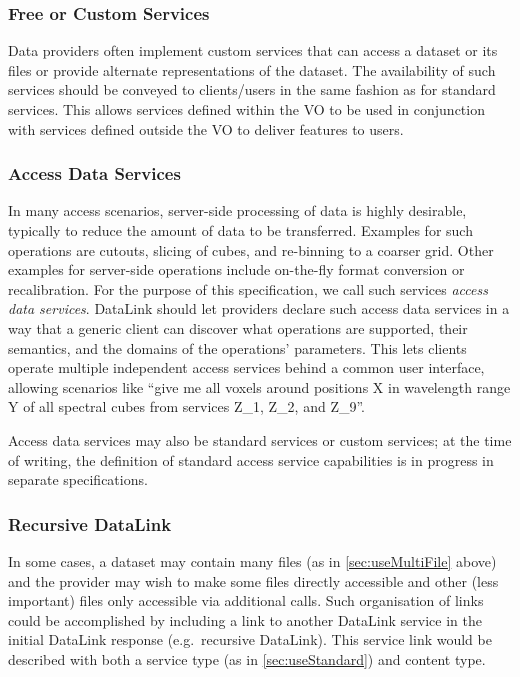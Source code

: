 \documentclass[11pt,a4paper]{ivoa}
\begin{document}
\subsubsection{Free or Custom Services}
\label{sec:useCustom}

Data providers often implement custom services that can access a dataset
or its files or provide alternate representations of the dataset. The
availability of such services should be conveyed to clients/users in
the same fashion as for standard services. This allows services defined
within the VO to be used in conjunction with services defined outside
the VO to deliver features to users.


\subsubsection{Access Data Services}

In many access scenarios, server-side processing of data is
highly desirable, typically to reduce the amount of data to be
transferred. Examples for such operations are cutouts, slicing of
cubes, and re-binning to a coarser grid. Other examples for server-side
operations include on-the-fly format conversion or recalibration. For
the purpose of this specification, we call such services
{\em access data services}.
DataLink should let providers declare such access data services
in a way that a generic client can discover what operations are supported,
their semantics, and the domains of the operations' parameters. This lets
clients operate multiple independent access services behind a common user
interface, allowing scenarios like ``give me all voxels around positions
X in wavelength range Y of all spectral cubes from services Z\_1, Z\_2,
and Z\_9''.

Access data services may also be standard services or custom services;
at the time of writing, the definition of standard access service
capabilities is in progress in separate specifications.


\subsubsection{Recursive DataLink}

In some cases, a dataset may contain many files
(as in \ref{sec:useMultiFile} above)
and the provider may wish to make some files directly accessible and
other (less important) files only accessible via additional calls. Such
organisation of links could be accomplished by including a link to
another DataLink service in the initial DataLink response (e.g.\ recursive
DataLink). This service link would be described with both a service type
(as in \ref{sec:useStandard}) and content type.
\end{document}
